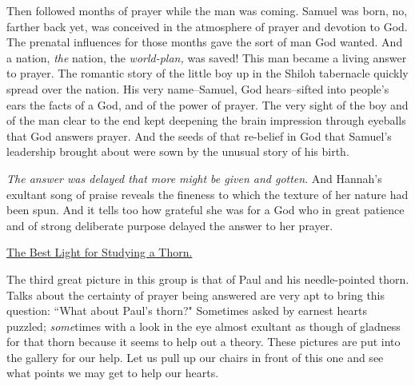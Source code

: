 Then followed months of prayer while the man was coming. Samuel was born,
no, farther back yet, was conceived in the atmosphere of prayer and
devotion to God. The prenatal influences for those months gave the sort of
man God wanted. And a nation, \textit{the} nation, the \textit{world-plan,} was saved!
This man became a living answer to prayer. The romantic story of the
little boy up in the Shiloh tabernacle quickly spread over the nation. His
very name--Samuel, God hears--sifted into people's ears the facts of a
God, and of the power of prayer. The very sight of the boy and of the man
clear to the end kept deepening the brain impression through eyeballs that
God answers prayer. And the seeds of that re-belief in God that Samuel's
leadership brought about were sown by the unusual story of his birth.

\textit{The answer was delayed that more might be given and gotten}. And Hannah's
exultant song of praise reveals the fineness to which the texture of her
nature had been spun. And it tells too how grateful she was for a God who
in great patience and of strong deliberate purpose delayed the answer to
her prayer.



\underline{The Best Light for Studying a Thorn.}


The third great picture in this group is that of Paul and his
needle-pointed thorn. Talks about the certainty of prayer being answered
are very apt to bring this question: ``What about Paul's thorn?" Sometimes
asked by earnest hearts puzzled; \textit{some}times with a look in the eye almost
exultant as though of gladness for that thorn because it seems to help out
a theory. These pictures are put into the gallery for our help. Let us
pull up our chairs in front of this one and see what points we may get to
help our hearts.

